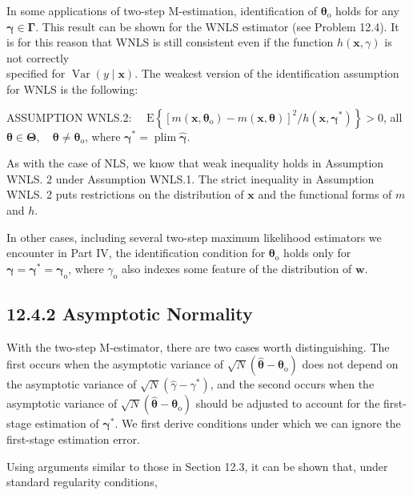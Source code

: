 \documentclass[10pt]{article}
\begin{document}
In some applications of two-step M-estimation, identification of $\boldsymbol{\theta}_{\mathrm{o}}$ holds for any $\boldsymbol{\gamma} \in \boldsymbol{\Gamma}$. This result can be shown for the WNLS estimator (see Problem 12.4). It is for this reason that WNLS is still consistent even if the function $h(\mathbf{x}, \gamma)$ is not correctly\\
specified for $\operatorname{Var}(y \mid \mathbf{x})$. The weakest version of the identification assumption for WNLS is the following:

ASSUMPTION WNLS.2: $\quad \mathrm{E}\left\{\left[m\left(\mathbf{x}, \boldsymbol{\theta}_{\mathrm{o}}\right)-m(\mathbf{x}, \boldsymbol{\theta})\right]^{2} / h\left(\mathbf{x}, \boldsymbol{\gamma}^{*}\right)\right\}>0$, all $\boldsymbol{\theta} \in \boldsymbol{\Theta}, \quad \boldsymbol{\theta} \neq \boldsymbol{\theta}_{\mathrm{o}}$, where $\boldsymbol{\gamma}^{*}=\operatorname{plim} \hat{\boldsymbol{\gamma}}$.

As with the case of NLS, we know that weak inequality holds in Assumption WNLS. 2 under Assumption WNLS.1. The strict inequality in Assumption WNLS. 2 puts restrictions on the distribution of $\mathbf{x}$ and the functional forms of $m$ and $h$.

In other cases, including several two-step maximum likelihood estimators we encounter in Part IV, the identification condition for $\boldsymbol{\theta}_{\mathrm{o}}$ holds only for $\boldsymbol{\gamma}=\boldsymbol{\gamma}^{*}=\boldsymbol{\gamma}_{\mathrm{o}}$, where $\gamma_{\mathrm{o}}$ also indexes some feature of the distribution of $\mathbf{w}$.

\subsection*{12.4.2 Asymptotic Normality}
With the two-step M-estimator, there are two cases worth distinguishing. The first occurs when the asymptotic variance of $\sqrt{N}\left(\hat{\boldsymbol{\theta}}-\boldsymbol{\theta}_{\mathrm{o}}\right)$ does not depend on the asymptotic variance of $\sqrt{N}\left(\hat{\gamma}-\gamma^{*}\right)$, and the second occurs when the asymptotic variance of $\sqrt{N}\left(\hat{\boldsymbol{\theta}}-\boldsymbol{\theta}_{\mathrm{o}}\right)$ should be adjusted to account for the first-stage estimation of $\boldsymbol{\gamma}^{*}$. We first derive conditions under which we can ignore the first-stage estimation error.

Using arguments similar to those in Section 12.3, it can be shown that, under standard regularity conditions,
\end{document}
